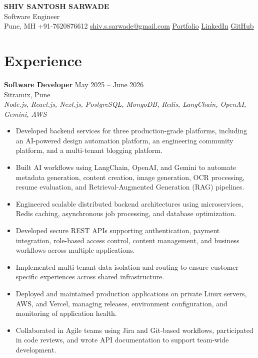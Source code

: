\documentclass[a4paper,10pt]{article}
\begin{document}
\pagestyle{empty}

\begin{center}
    {\LARGE \textbf{SHIV SANTOSH SARWADE}}\\
    Software Engineer \\[4pt]
    Pune, MH \quad
    +91-7620876612 \quad
    \href{mailto:shiv.s.sarwade@gmail.com}{shiv.s.sarwade@gmail.com} \quad
    \href{https://www.shivsarwade.space}{Portfolio} \quad
    \href{https://linkedin.com/in/shiv-sarwade}{LinkedIn} \quad
    \href{https://github.com/ShivSarwade}{GitHub}
\end{center}

\section*{Experience}

\textbf{Software Developer} \hfill May 2025 -- June 2026\\
Sitramix, Pune\\
\textit{Node.js, React.js, Next.js, PostgreSQL, MongoDB, Redis, LangChain, OpenAI, Gemini, AWS}

\begin{itemize}[leftmargin=*]
    \item Developed backend services for three production-grade platforms, including an AI-powered design automation platform, an engineering community platform, and a multi-tenant blogging platform.
    \item Built AI workflows using LangChain, OpenAI, and Gemini to automate metadata generation, content creation, image generation, OCR processing, resume evaluation, and Retrieval-Augmented Generation (RAG) pipelines.
    \item Engineered scalable distributed backend architectures using microservices, Redis caching, asynchronous job processing, and database optimization.
    \item Developed secure REST APIs supporting authentication, payment integration, role-based access control, content management, and business workflows across multiple applications.
    \item Implemented multi-tenant data isolation and routing to ensure customer-specific experiences across shared infrastructure.
    \item Deployed and maintained production applications on private Linux servers, AWS, and Vercel, managing releases, environment configuration, and monitoring of application health.
    \item Collaborated in Agile teams using Jira and Git-based workflows, participated in code reviews, and wrote API documentation to support team-wide development.
\end{itemize}
\end{document}
